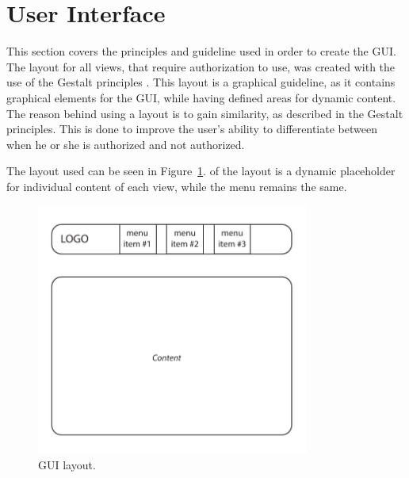 \section{User Interface}

This section covers the principles and guideline used in order to create the \ac{GUI}.
The layout for all views, that require authorization to use, was created with the use of the Gestalt principles \citep{gestalt_principles}.
This layout is a graphical guideline, as it contains graphical elements for the \acs{GUI}, while having defined areas for dynamic content.
The reason behind using a layout is to gain similarity, as described in the Gestalt principles.
This is done to improve the user's ability to differentiate between when he or she is authorized and not authorized.

The layout used can be seen in Figure~\ref{fig:gui_layout}.
 of the layout is a dynamic placeholder for individual content of each view, while the menu remains the same.

\begin{figure}[htb]
    \centering
    \includegraphics[width=0.8\textwidth]{gfx/gui_layout.pdf}
    \caption{\acs{GUI} layout.}
    \label{fig:gui_layout}
\end{figure}

